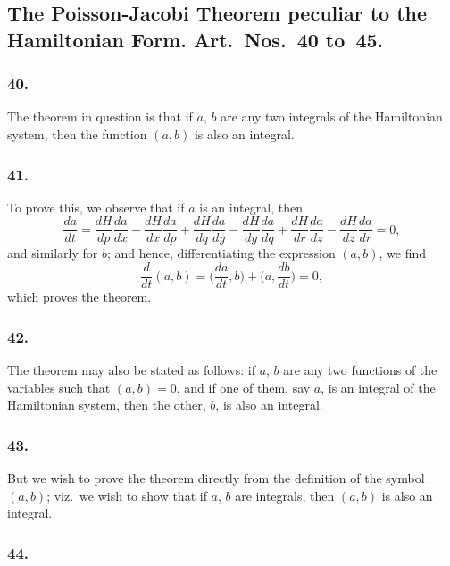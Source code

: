 \documentclass[11pt,a4paper]{book}
\begin{document}
\subsection*{The Poisson-Jacobi Theorem peculiar to the Hamiltonian Form. Art.~Nos.~40 to~45.}

\subsubsection*{40.}

The theorem in question is that if $a$, $b$ are any two integrals of the Hamiltonian system, then the function $(a, b)$ is also an integral.

\subsubsection*{41.}

To prove this, we observe that if $a$ is an integral, then
\[
\frac{da}{dt} = \frac{dH}{dp}\frac{da}{dx} - \frac{dH}{dx}\frac{da}{dp} + \frac{dH}{dq}\frac{da}{dy} - \frac{dH}{dy}\frac{da}{dq} + \frac{dH}{dr}\frac{da}{dz} - \frac{dH}{dz}\frac{da}{dr} = 0,
\]
and similarly for $b$; and hence, differentiating the expression $(a, b)$, we find
\[
\frac{d}{dt}(a, b) = \biggl(\frac{da}{dt}, b\biggr) + \biggl(a, \frac{db}{dt}\biggr) = 0,
\]
which proves the theorem.

\newpage
\setcounter{page}{129}

\subsubsection*{42.}

The theorem may also be stated as follows: if $a$, $b$ are any two functions of the variables such that $(a, b) = 0$, and if one of them, say $a$, is an integral of the Hamiltonian system, then the other, $b$, is also an integral.

\subsubsection*{43.}

But we wish to prove the theorem directly from the definition of the symbol $(a, b)$; viz.~we wish to show that if $a$, $b$ are integrals, then $(a, b)$ is also an integral.

\subsubsection*{44.}
\end{document}
